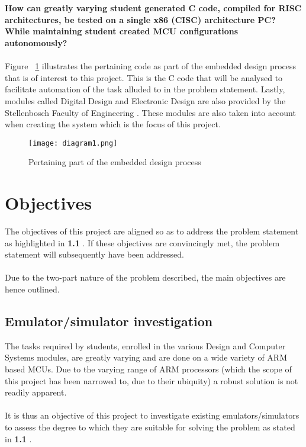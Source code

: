 \\\\
\textbf{How can greatly varying student generated C code, compiled for RISC architectures, be tested on a single x86 (CISC) architecture PC? While maintaining student created MCU configurations autonomously?}
\\\\
Figure ~\ref{fig:introDia} illustrates the pertaining code as part of the embedded design process that is of interest to this project. This is the C code that will be analysed to facilitate automation of the task alluded to in the problem statement. Lastly, modules called Digital Design and Electronic Design are also provided by the Stellenbosch Faculty of Engineering \cite{Stelle2020}. These modules are also taken into account when creating the system which is the focus of this project.
\begin{figure}[H]
\begin{center}
\texttt{[image: diagram1.png]}
\caption{Pertaining part of the embedded design process}
\label{fig:introDia}
\end{center}
\end{figure}

\section{Objectives}
\label{obj}
The objectives of this project are aligned so as to address the problem statement as highlighted in \textbf{1.1 }. If these objectives are convincingly  met, the problem statement will subsequently have been addressed.
\\\\
Due to the two-part nature of the problem described, the main objectives are hence outlined.
\subsection{Emulator/simulator investigation}
\label{emInvestScope}
The tasks required by students, enrolled in the various Design and Computer Systems modules, are greatly varying and are done on a wide variety of ARM based MCUs. Due to the varying range of ARM processors (which the scope of this project has been narrowed to, due to their ubiquity) a robust solution is not readily apparent.
\\\\
It is thus an objective of this project to investigate existing emulators/simulators to assess the degree to which they are suitable for solving the problem as stated in \textbf{1.1 }.
